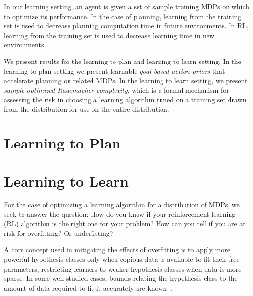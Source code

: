 In our learning setting, an agent is given a set of sample training MDPs on which to optimize its performance. In the case of planning, learning from the training set is used to decrease planning computation time in future environments. In RL, learning from the training set is used to decrease learning time in new environments.

We present results for the learning to plan and learning to learn setting. In the learning to plan setting we present learnable \emph{goal-based action priors} that accelerate planning on related MDPs. In the learning to learn setting, we present \emph{sample-optimized Rademacher complexity},
which is a formal mechanism for assessing the risk in choosing a learning algorithm tuned on a training set drawn from the distribution for use on the entire distribution.

\section{Learning to Plan}



\section{Learning to Learn}
For the case of optimizing a learning algorithm for a distribution of MDPs, we seek to answer the question: How do you know if your reinforcement-learning (RL) algorithm is the right one for your problem? How can you tell if you are at risk for overfitting? Or underfitting?


A core concept used in mitigating the effects of overfitting is to apply more powerful hypothesis classes only when copious data is available to fit their free parameters, restricting learners to weaker hypothesis classes when data is more sparse. In some well-studied cases, bounds relating the hypothesis class to the amount of data required to fit it accurately are known~\cite{blumer1989learnability}. 

